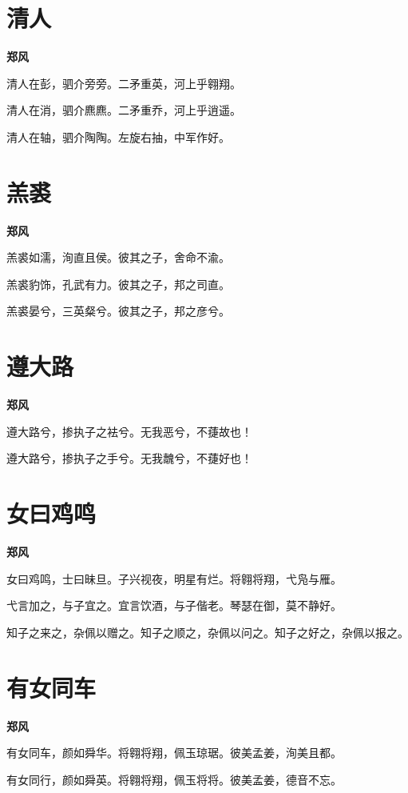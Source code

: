 \documentclass[12pt,a4paper]{ctexbook}
\begin{document}
\section{清人}
\textbf{郑风}\par\vspace{0.5em}
清人在彭，驷介旁旁。二矛重英，河上乎翱翔。\par
清人在消，驷介麃麃。二矛重乔，河上乎逍遥。\par
清人在轴，驷介陶陶。左旋右抽，中军作好。\par

\section{羔裘}
\textbf{郑风}\par\vspace{0.5em}
羔裘如濡，洵直且侯。彼其之子，舍命不渝。\par
羔裘豹饰，孔武有力。彼其之子，邦之司直。\par
羔裘晏兮，三英粲兮。彼其之子，邦之彦兮。\par

\section{遵大路}
\textbf{郑风}\par\vspace{0.5em}
遵大路兮，掺执子之袪兮。无我恶兮，不蓵故也！\par
遵大路兮，掺执子之手兮。无我魗兮，不蓵好也！\par

\section{女曰鸡鸣}
\textbf{郑风}\par\vspace{0.5em}
女曰鸡鸣，士曰昧旦。子兴视夜，明星有烂。将翱将翔，弋凫与雁。\par
弋言加之，与子宜之。宜言饮酒，与子偕老。琴瑟在御，莫不静好。\par
知子之来之，杂佩以赠之。知子之顺之，杂佩以问之。知子之好之，杂佩以报之。\par

\section{有女同车}
\textbf{郑风}\par\vspace{0.5em}
有女同车，颜如舜华。将翱将翔，佩玉琼琚。彼美孟姜，洵美且都。\par
有女同行，颜如舜英。将翱将翔，佩玉将将。彼美孟姜，德音不忘。\par
\end{document}
